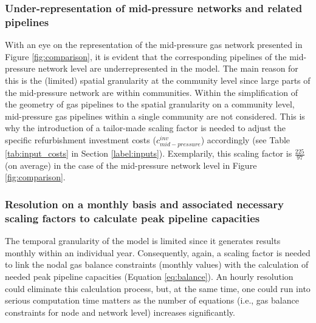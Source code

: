 \subsubsection{Under-representation of mid-pressure networks and related pipelines}
With an eye on the representation of the mid-pressure gas network presented in Figure \ref{fig:comparison}, it is evident that the corresponding pipelines of the mid-pressure network level are underrepresented in the model. The main reason for this is the (limited) spatial granularity at the community level since large parts of the mid-pressure network are within communities. Within the simplification of the geometry of gas pipelines to the spatial granularity on a community level, mid-pressure gas pipelines within a single community are not considered. This is why the introduction of a tailor-made scaling factor is needed to adjust the specific refurbishment investment costs ($c^{inv}_{mid-pressure}$) accordingly (see Table \ref{tab:input_costs} in Section \ref{label:inputs}). Exemplarily, this scaling factor is $\frac{225}{97}$ (on average) in the case of the mid-pressure network level in Figure \ref{fig:comparison}. 

\subsubsection{Resolution on a monthly basis and associated necessary scaling factors to calculate peak pipeline capacities}
The temporal granularity of the model is limited since it generates results monthly within an individual year. Consequently, again, a scaling factor is needed to link the nodal gas balance constraints (monthly values) with the calculation of needed peak pipeline capacities (Equation \ref{eq:balance}). An hourly resolution could eliminate this calculation process, but, at the same time, one could run into serious computation time matters as the number of equations (i.e., gas balance constraints for node and network level) increases significantly. 


